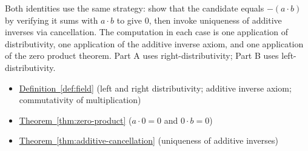 \begin{remark*}
Both identities use the same strategy: show that the candidate equals
$-(a\cdot b)$ by verifying it sums with $a\cdot b$ to give $0$, then invoke
uniqueness of additive inverses via cancellation.  The computation in each
case is one application of distributivity, one application of the additive
inverse axiom, and one application of the zero product theorem.  Part A uses
right-distributivity; Part B uses left-distributivity.
\end{remark*}

\begin{dependencies}
\begin{itemize}
  \item \hyperref[def:field]{Definition~\ref*{def:field}}
        \textnormal{(left and right distributivity; additive inverse axiom;
        commutativity of multiplication)}
  \item \hyperref[thm:zero-product]{Theorem~\ref*{thm:zero-product}}
        \textnormal{($a\cdot 0 = 0$ and $0\cdot b = 0$)}
  \item \hyperref[thm:additive-cancellation]{Theorem~\ref*{thm:additive-cancellation}}
        \textnormal{(uniqueness of additive inverses)}
\end{itemize}
\end{dependencies}
